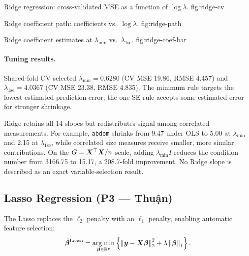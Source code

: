 %
    {Ridge regression: cross-validated MSE as a function of $\log\lambda$.}%
    {fig:ridge-cv}

%
    {Ridge coefficient path: coefficients vs.\ $\log\lambda$.}%
    {fig:ridge-path}

%
    {Ridge coefficient estimates at $\lambda_{\min}$ vs.\ $\lambda_{1\mathrm{se}}$.}%
    {fig:ridge-coef-bar}

\paragraph{Tuning results.}
Shared-fold CV selected $\lambda_{\min}=0.6280$ (CV MSE 19.86, RMSE
4.457) and $\lambda_{1\mathrm{se}}=4.0367$ (CV MSE 23.38, RMSE 4.835).
The minimum rule targets the lowest estimated prediction error; the one-SE rule
accepts some estimated error for stronger shrinkage.





Ridge retains all 14 slopes but redistributes signal among correlated
measurements.  For example, \texttt{abdom} shrinks from 9.47 under OLS to 5.00
at $\lambda_{\min}$ and 2.15 at $\lambda_{1\mathrm{se}}$, while correlated
size measures receive smaller, more similar contributions.  On the
$G=\bm{X}^\top\bm{X}/n$ scale, adding $\lambda_{\min}I$ reduces the condition number
from 3166.75 to 15.17, a 208.7-fold improvement.  No Ridge slope is described
as an exact variable-selection result.

\subsection{Lasso Regression (P3 — Thuận)}
\label{sec:lasso}

The Lasso replaces the $\ell_2$ penalty with an $\ell_1$ penalty, enabling
automatic feature selection:
\[
    \hat{\bm{\beta}}^{\mathrm{Lasso}}
    = \operatorname*{arg\,min}_{\bm{\beta} \in \mathbb{R}^p}
      \left\{
          \left\lVert \bm{y} - \bm{X} \bm{\beta} \right\rVert_2^2
          + \lambda \left\lVert \bm{\beta} \right\rVert_1
      \right\}.
\]

